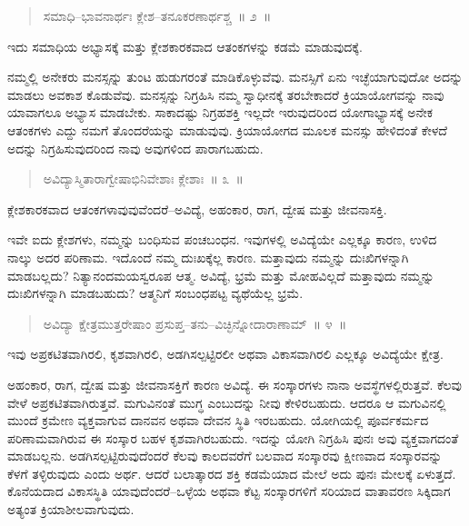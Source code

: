 \vspace{-0.3cm}

\begin{verse}
ಸಮಾಧಿ–ಭಾವನಾರ್ಥಃ ಕ್ಲೇಶ–ತನೂಕರಣಾರ್ಥಶ್ಚ~॥ ೨~॥
\end{verse}

\vspace{-0.3cm}

ಇದು ಸಮಾಧಿಯ ಅಭ್ಯಾಸಕ್ಕೆ ಮತ್ತು ಕ್ಲೇಶಕಾರಕವಾದ ಆತಂಕಗಳನ್ನು ಕಡಮೆ ಮಾಡುವುದಕ್ಕೆ. 

ನಮ್ಮಲ್ಲಿ ಅನೇಕರು ಮನಸ್ಸನ್ನು ತುಂಟ ಹುಡುಗರಂತೆ ಮಾಡಿಕೊಳ್ಳುವೆವು. ಮನಸ್ಸಿಗೆ ಏನು ಇಚ್ಛೆಯಾಗುವುದೋ ಅದನ್ನು ಮಾಡಲು ಅವಕಾಶ ಕೊಡುವೆವು. ಮನಸ್ಸನ್ನು ನಿಗ್ರಹಿಸಿ ನಮ್ಮ ಸ್ವಾಧೀನಕ್ಕೆ ತರಬೇಕಾದರೆ ಕ್ರಿಯಾಯೋಗವನ್ನು ನಾವು ಯಾವಾಗಲೂ ಅಭ್ಯಾಸ ಮಾಡಬೇಕು. ಸಾಕಾದಷ್ಟು ನಿಗ್ರಹಶಕ್ತಿ ಇಲ್ಲದೇ ಇರುವುದರಿಂದ ಯೋಗಾಭ್ಯಾಸಕ್ಕೆ ಅನೇಕ ಆತಂಕಗಳು ಎದ್ದು ನಮಗೆ ತೊಂದರೆಯನ್ನು ಮಾಡುವುವು. ಕ್ರಿಯಾಯೋಗದ ಮೂಲಕ ಮನಸ್ಸು ಹೇಳಿದಂತೆ ಕೇಳದೆ ಅದನ್ನು ನಿಗ್ರಹಿಸುವುದರಿಂದ ನಾವು ಅವುಗಳಿಂದ ಪಾರಾಗಬಹುದು. 

\vspace{-0.3cm}

\begin{verse}
ಅವಿದ್ಯಾಸ್ಮಿತಾರಾಗ್ವೇಷಾಭಿನಿವೇಶಾಃ ಕ್ಲೇಶಾಃ~॥ ೩~॥
\end{verse}

\vspace{-0.3cm}

ಕ್ಲೇಶಕಾರಕವಾದ ಆತಂಕಗಳಾವುವುವೆಂದರೆ–ಅವಿದ್ಯೆ, ಅಹಂಕಾರ, ರಾಗ, ದ್ವೇಷ ಮತ್ತು ಜೀವನಾಸಕ್ತಿ. 

ಇವೇ ಐದು ಕ್ಲೇಶಗಳು, ನಮ್ಮನ್ನು ಬಂಧಿಸುವ ಪಂಚಬಂಧನ. ಇವುಗಳಲ್ಲಿ ಅವಿದ್ಯೆಯೇ ಎಲ್ಲಕ್ಕೂ ಕಾರಣ, ಉಳಿದ ನಾಲ್ಕು ಅದರ ಪರಿಣಾಮ. ಇದೊಂದೆ ನಮ್ಮ ದುಃಖಕ್ಕೆಲ್ಲ ಕಾರಣ. ಮತ್ತಾವುದು ನಮ್ಮನ್ನು ದುಃಖಿಗಳನ್ನಾಗಿ ಮಾಡಬಲ್ಲದು? ನಿತ್ಯಾನಂದಮಯಸ್ವರೂಪ ಆತ್ಮ. ಅವಿದ್ಯೆ, ಭ್ರಮೆ ಮತ್ತು ಮೋಹವಿಲ್ಲದೆ ಮತ್ತಾವುದು ನಮ್ಮನ್ನು ದುಃಖಿಗಳನ್ನಾಗಿ ಮಾಡಬಹುದು? ಆತ್ಮನಿಗೆ ಸಂಬಂಧಪಟ್ಟ ವ್ಯಥೆಯೆಲ್ಲ ಭ್ರಮೆ. 

\vspace{-0.3cm}

\begin{verse}
ಅವಿದ್ಯಾ ಕ್ಷೇತ್ರಮುತ್ತರೇಷಾಂ ಪ್ರಸುಪ್ತ–ತನು–ವಿಚ್ಛಿನ್ನೋದಾರಾಣಾಮ್​~॥ ೪~॥
\end{verse}

\vspace{-0.3cm}

ಇವು ಅಪ್ರಕಟಿತವಾಗಿರಲಿ, ಕೃಶವಾಗಿರಲಿ, ಅಡಗಿಸಲ್ಪಟ್ಟಿರಲೀ ಅಥವಾ ವಿಕಾಸವಾಗಿರಲಿ ಎಲ್ಲಕ್ಕೂ ಅವಿದ್ಯೆಯೇ ಕ್ಷೇತ್ರ. 

ಅಹಂಕಾರ, ರಾಗ, ದ್ವೇಷ ಮತ್ತು ಜೀವನಾಸಕ್ತಿಗೆ ಕಾರಣ ಅವಿದ್ಯೆ. ಈ ಸಂಸ್ಕಾರಗಳು ನಾನಾ ಅವಸ್ಥೆಗಳಲ್ಲಿರುತ್ತವೆ. ಕೆಲವು ವೇಳೆ ಅಪ್ರಕಟಿತವಾಗಿರುತ್ತವೆ. ಮಗುವಿನಂತೆ ಮುಗ್ಧ ಎಂಬುದನ್ನು ನೀವು ಕೇಳಿರಬಹುದು. ಆದರೂ ಆ ಮಗುವಿನಲ್ಲಿ ಮುಂದೆ ಕ್ರಮೇಣ ವ್ಯಕ್ತವಾಗುವ ದಾನವನ ಅಥವಾ ದೇವನ ಸ್ಥಿತಿ ಇರಬಹುದು. ಯೋಗಿಯಲ್ಲಿ ಪೂರ್ವಕರ್ಮದ ಪರಿಣಾಮವಾಗಿರುವ ಈ ಸಂಸ್ಕಾರ ಬಹಳ ಕೃಶವಾಗಿರಬಹುದು. ಇದನ್ನು ಯೋಗಿ ನಿಗ್ರಹಿಸಿ ಪುನಃ ಅವು ವ್ಯಕ್ತವಾಗದಂತೆ ಮಾಡಬಲ್ಲನು. ಅಡಗಿಸಲ್ಪಟ್ಟಿರುವುದೆಂದರೆ ಕೆಲವು ಕಾಲದವರೆಗೆ ಬಲವಾದ ಸಂಸ್ಕಾರವು ಕ್ಷೀಣವಾದ ಸಂಸ್ಕಾರವನ್ನು ಕೆಳಗೆ ತಳ್ಳಿರುವುದು ಎಂದು ಅರ್ಥ. ಆದರೆ ಬಲಾತ್ಕಾರದ ಶಕ್ತಿ ಕಡಮೆಯಾದ ಮೇಲೆ ಅದು ಪುನಃ ಮೇಲಕ್ಕೆ ಏಳುತ್ತದೆ. ಕೊನೆಯದಾದ ವಿಕಾಸಸ್ಥಿತಿ ಯಾವುದೆಂದರೆ–ಒಳ್ಳೆಯ ಅಥವಾ ಕೆಟ್ಟ ಸಂಸ್ಕಾರಗಳಿಗೆ ಸರಿಯಾದ ವಾತಾವರಣ ಸಿಕ್ಕಿದಾಗ ಅತ್ಯಂತ ಕ್ರಿಯಾಶೀಲವಾಗುವುದು. 

